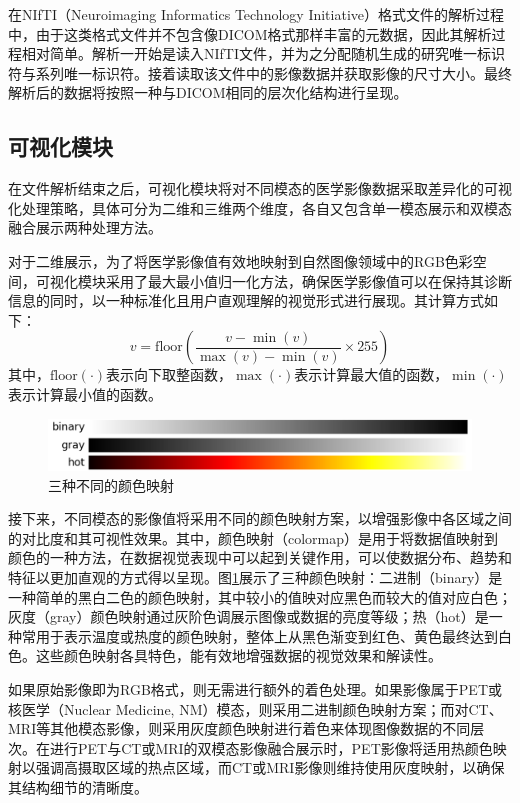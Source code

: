 在NIfTI（Neuroimaging Informatics Technology Initiative）格式文件的解析过程中，由于这类格式文件并不包含像DICOM格式那样丰富的元数据，因此其解析过程相对简单。解析一开始是读入NIfTI文件，并为之分配随机生成的研究唯一标识符与系列唯一标识符。接着读取该文件中的影像数据并获取影像的尺寸大小。最终解析后的数据将按照一种与DICOM相同的层次化结构进行呈现。

\subsection{可视化模块}

在文件解析结束之后，可视化模块将对不同模态的医学影像数据采取差异化的可视化处理策略，具体可分为二维和三维两个维度，各自又包含单一模态展示和双模态融合展示两种处理方法。

对于二维展示，为了将医学影像值有效地映射到自然图像领域中的RGB色彩空间，可视化模块采用了最大最小值归一化方法，确保医学影像值可以在保持其诊断信息的同时，以一种标准化且用户直观理解的视觉形式进行展现。其计算方式如下：
\begin{equation}
    v =\text{floor}(\frac{v - \min(v)}{\max(v) - \min(v)} \times 255)
    \label{eq:chap05_min_max}
\end{equation}
其中，\(\text{floor}(\cdot)\)表示向下取整函数，\(\max(\cdot)\)表示计算最大值的函数，\(\min(\cdot)\)表示计算最小值的函数。

\begin{figure}[htbp]
    \centering
    \includegraphics[width=\textwidth]{figures/chap05_colormap.png}
    \caption{三种不同的颜色映射}
    \label{fig:chap05_colormap}
\end{figure}

接下来，不同模态的影像值将采用不同的颜色映射方案，以增强影像中各区域之间的对比度和其可视性效果。其中，颜色映射（colormap）是用于将数据值映射到颜色的一种方法，在数据视觉表现中可以起到关键作用，可以使数据分布、趋势和特征以更加直观的方式得以呈现。图\ref{fig:chap05_colormap}展示了三种颜色映射：二进制（binary）是一种简单的黑白二色的颜色映射，其中较小的值映对应黑色而较大的值对应白色；灰度（gray）颜色映射通过灰阶色调展示图像或数据的亮度等级；热（hot）是一种常用于表示温度或热度的颜色映射，整体上从黑色渐变到红色、黄色最终达到白色。这些颜色映射各具特色，能有效地增强数据的视觉效果和解读性。

如果原始影像即为RGB格式，则无需进行额外的着色处理。如果影像属于PET或核医学（Nuclear Medicine, NM）模态，则采用二进制颜色映射方案；而对CT、MRI等其他模态影像，则采用灰度颜色映射进行着色来体现图像数据的不同层次。在进行PET与CT或MRI的双模态影像融合展示时，PET影像将适用热颜色映射以强调高摄取区域的热点区域，而CT或MRI影像则维持使用灰度映射，以确保其结构细节的清晰度。

